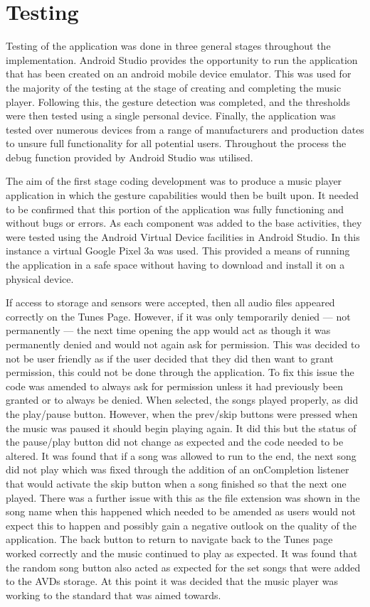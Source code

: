 \documentclass{l4proj}
\begin{document}
\section{Testing}

Testing of the application was done in three general stages throughout the implementation. Android Studio provides the opportunity to run the application that has been created on an android mobile device emulator. This was used for the majority of the testing at the stage of creating and completing the music player. Following this, the gesture detection was completed, and the thresholds were then tested using a single personal device. Finally, the application was tested over numerous devices from a range of manufacturers and production dates to unsure full functionality for all potential users. Throughout the process the debug function provided by Android Studio was utilised.

The aim of the first stage coding development was to produce a music player application in which the gesture capabilities would then be built upon. It needed to be confirmed that this portion of the application was fully functioning and without bugs or errors. As each component was added to the base activities, they were tested using the Android Virtual Device facilities in Android Studio. In this instance a virtual Google Pixel 3a was used. This provided a means of running the application in a safe space without having to download and install it on a physical device. 

If access to storage and sensors were accepted, then all audio files appeared correctly on the Tunes Page. However, if it was only temporarily denied --- not permanently --- the next time opening the app would act as though it was permanently denied and would not again ask for permission. This was decided to not be user friendly as if the user decided that they did then want to grant permission, this could not be done through the application. To fix this issue the code was amended to always ask for permission unless it had previously been granted or to always be denied. When selected, the songs played properly, as did the play/pause button. However, when the prev/skip buttons were pressed when the music was paused it should begin playing again. It did this but the status of the pause/play button did not change as expected and the code needed to be altered. It was found that if a song was allowed to run to the end, the next song did not play which was fixed through the addition of an onCompletion listener that would activate the skip button when a song finished so that the next one played. There was a further issue with this as the file extension was shown in the song name when this happened which needed to be amended as users would not expect this to happen and possibly gain a negative outlook on the quality of the application. The back button to return to navigate back to the Tunes page worked correctly and the music continued to play as expected. It was found that the random song button also acted as expected for the set songs that were added to the AVDs storage. At this point it was decided that the music player was working to the standard that was aimed towards.
\end{document}
